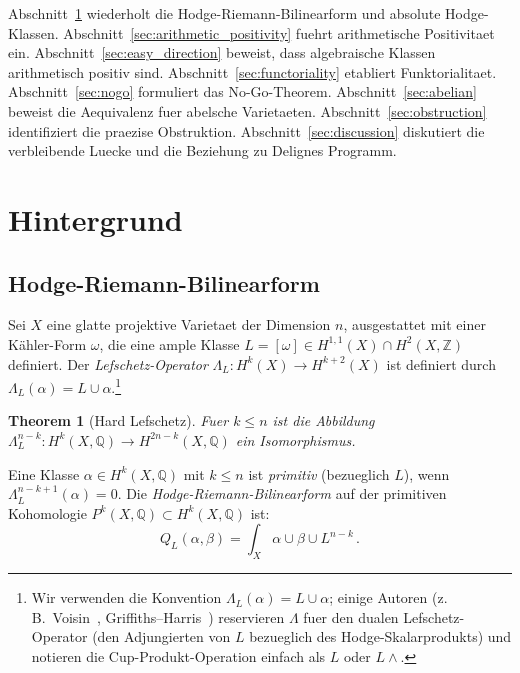 \documentclass[aps,prd,twocolumn,superscriptaddress,nofootinbib]{revtex4-2}
\newtheorem{theorem}{Theorem}[section]
\theoremstyle{definition}
\theoremstyle{remark}
\begin{document}
Abschnitt~\ref{sec:background} wiederholt die Hodge-Riemann-Bilinearform und absolute Hodge-Klassen. Abschnitt~\ref{sec:arithmetic_positivity} fuehrt arithmetische Positivitaet ein. Abschnitt~\ref{sec:easy_direction} beweist, dass algebraische Klassen arithmetisch positiv sind. Abschnitt~\ref{sec:functoriality} etabliert Funktorialitaet. Abschnitt~\ref{sec:nogo} formuliert das No-Go-Theorem. Abschnitt~\ref{sec:abelian} beweist die Aequivalenz fuer abelsche Varietaeten. Abschnitt~\ref{sec:obstruction} identifiziert die praezise Obstruktion. Abschnitt~\ref{sec:discussion} diskutiert die verbleibende Luecke und die Beziehung zu Delignes Programm.


\section{Hintergrund}
\label{sec:background}

\subsection{Hodge-Riemann-Bilinearform}

Sei $X$ eine glatte projektive Varietaet der Dimension $n$, ausgestattet mit einer K\"ahler-Form $\omega$, die eine ample Klasse $L = [\omega] \in H^{1,1}(X) \cap H^2(X, \mathbb{Z})$ definiert. Der \textit{Lefschetz-Operator} $\Lambda_L: H^k(X) \to H^{k+2}(X)$ ist definiert durch $\Lambda_L(\alpha) = L \cup \alpha$.\footnote{Wir verwenden die Konvention $\Lambda_L(\alpha) = L \cup \alpha$; einige Autoren (z.\,B.\ Voisin~\cite{Voisin2002}, Griffiths--Harris~\cite{GH1978}) reservieren $\Lambda$ fuer den dualen Lefschetz-Operator (den Adjungierten von $L$ bezueglich des Hodge-Skalarprodukts) und notieren die Cup-Produkt-Operation einfach als $L$ oder $L \wedge$.}

\begin{theorem}[Hard Lefschetz]
\label{thm:hard_lefschetz}
Fuer $k \leq n$ ist die Abbildung $\Lambda_L^{n-k}: H^k(X, \mathbb{Q}) \to H^{2n-k}(X, \mathbb{Q})$ ein Isomorphismus.
\end{theorem}

Eine Klasse $\alpha \in H^k(X, \mathbb{Q})$ mit $k \leq n$ ist \textit{primitiv} (bezueglich $L$), wenn $\Lambda_L^{n-k+1}(\alpha) = 0$. Die \textit{Hodge-Riemann-Bilinearform} auf der primitiven Kohomologie $P^k(X, \mathbb{Q}) \subset H^k(X, \mathbb{Q})$ ist:
\begin{equation}
Q_L(\alpha, \beta) = \int_X \alpha \cup \beta \cup L^{n-k}\,.
\label{eq:HR_form}
\end{equation}
\end{document}
